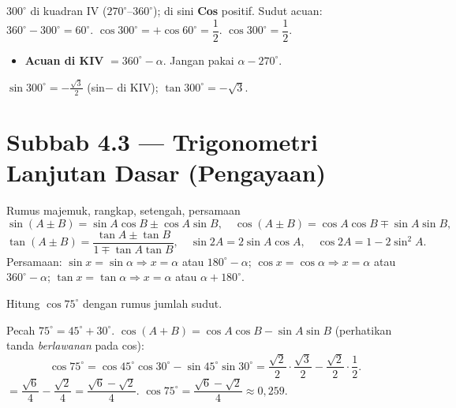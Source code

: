 \jawab
{} $300^\circ$ di kuadran IV ($270^\circ$--$360^\circ$); di sini
\textbf{Cos} positif.
 Sudut acuan: $360^\circ-300^\circ=60^\circ$.
 $\cos300^\circ=+\cos60^\circ=\dfrac12$.
\jadi $\cos300^\circ=\dfrac12$.

\begin{jebakan}
\begin{itemize}[leftmargin=*,topsep=2pt]
  \item \textbf{Acuan di KIV} $=360^\circ-\alpha$. Jangan pakai $\alpha-270^\circ$.
\end{itemize}
\end{jebakan}

\begin{variasi}
$\sin300^\circ=-\frac{\sqrt3}{2}$ (sin$-$ di KIV); $\tan300^\circ=-\sqrt3$.
\end{variasi}

\section*{Subbab 4.3 — Trigonometri Lanjutan Dasar (Pengayaan)}

\begin{ingat}{Rumus majemuk, rangkap, setengah, persamaan}
\[
\sin(A\pm B)=\sin A\cos B\pm\cos A\sin B,\quad
\cos(A\pm B)=\cos A\cos B\mp\sin A\sin B,
\]
\[
\tan(A\pm B)=\frac{\tan A\pm\tan B}{1\mp\tan A\tan B},\quad
\sin2A=2\sin A\cos A,\quad \cos2A=1-2\sin^2 A.
\]
Persamaan: $\sin x=\sin\alpha\Rightarrow x=\alpha$ atau $180^\circ-\alpha$;\quad
$\cos x=\cos\alpha\Rightarrow x=\alpha$ atau $360^\circ-\alpha$;\quad
$\tan x=\tan\alpha\Rightarrow x=\alpha$ atau $\alpha+180^\circ$.
\end{ingat}

\begin{soalbox}{}
Hitung $\cos75^\circ$ dengan rumus jumlah sudut.
\end{soalbox}

\jawab
{} Pecah $75^\circ=45^\circ+30^\circ$.
 $\cos(A+B)=\cos A\cos B-\sin A\sin B$ (perhatikan tanda
\emph{berlawanan} pada cos):
\[
\cos75^\circ=\cos45^\circ\cos30^\circ-\sin45^\circ\sin30^\circ
=\frac{\sqrt2}{2}\cdot\frac{\sqrt3}{2}-\frac{\sqrt2}{2}\cdot\frac12.
\]
 $=\dfrac{\sqrt6}{4}-\dfrac{\sqrt2}{4}=\dfrac{\sqrt6-\sqrt2}{4}$.
\jadi $\cos75^\circ=\dfrac{\sqrt6-\sqrt2}{4}\approx0{,}259$.

